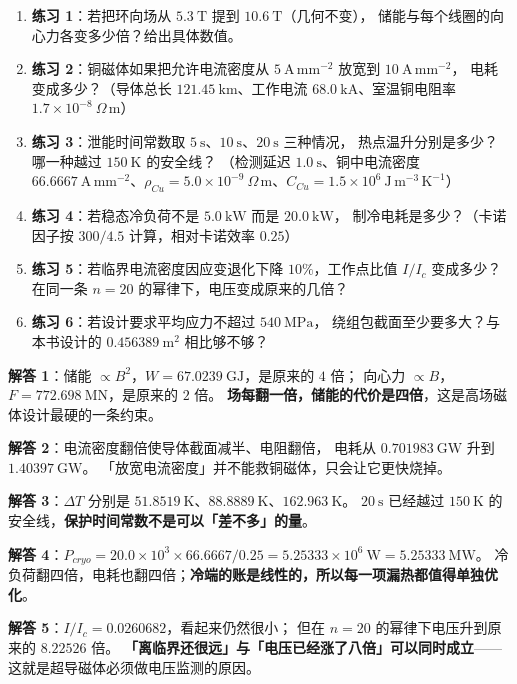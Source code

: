 \begin{enumerate}
\item \textbf{练习 1}：若把环向场从 $5.3\ \mathrm{T}$ 提到 $10.6\ \mathrm{T}$（几何不变），
储能与每个线圈的向心力各变多少倍？给出具体数值。
\item \textbf{练习 2}：铜磁体如果把允许电流密度从 $5\ \mathrm{A\,mm^{-2}}$ 放宽到 $10\ \mathrm{A\,mm^{-2}}$，
电耗变成多少？（导体总长 $121.45\ \mathrm{km}$、工作电流 $68.0\ \mathrm{kA}$、室温铜电阻率 $1.7\times10^{-8}\ \Omega\,\mathrm{m}$）
\item \textbf{练习 3}：泄能时间常数取 $5\ \mathrm{s}$、$10\ \mathrm{s}$、$20\ \mathrm{s}$ 三种情况，
热点温升分别是多少？哪一种越过 $150\ \mathrm{K}$ 的安全线？
（检测延迟 $1.0\ \mathrm{s}$、铜中电流密度 $66.6667\ \mathrm{A\,mm^{-2}}$、$\rho_{Cu}=5.0\times10^{-9}\ \Omega\,\mathrm{m}$、$C_{Cu}=1.5\times10^{6}\ \mathrm{J\,m^{-3}\,K^{-1}}$）
\item \textbf{练习 4}：若稳态冷负荷不是 $5.0\ \mathrm{kW}$ 而是 $20.0\ \mathrm{kW}$，
制冷电耗是多少？（卡诺因子按 $300/4.5$ 计算，相对卡诺效率 $0.25$）
\item \textbf{练习 5}：若临界电流密度因应变退化下降 $10\%$，工作点比值 $I/I_c$ 变成多少？
在同一条 $n=20$ 的幂律下，电压变成原来的几倍？
\item \textbf{练习 6}：若设计要求平均应力不超过 $540\ \mathrm{MPa}$，
绕组包截面至少要多大？与本书设计的 $0.456389\ \mathrm{m^{2}}$ 相比够不够？
\end{enumerate}

\textbf{解答 1}：储能 $\propto B^{2}$，$W=67.0239\ \mathrm{GJ}$，是原来的 $4$ 倍；
向心力 $\propto B$，$F=772.698\ \mathrm{MN}$，是原来的 $2$ 倍。
\textbf{场每翻一倍，储能的代价是四倍}，这是高场磁体设计最硬的一条约束。

\textbf{解答 2}：电流密度翻倍使导体截面减半、电阻翻倍，
电耗从 $0.701983\ \mathrm{GW}$ 升到 $1.40397\ \mathrm{GW}$。
「放宽电流密度」并不能救铜磁体，只会让它更快烧掉。

\textbf{解答 3}：$\Delta T$ 分别是 $51.8519\ \mathrm{K}$、$88.8889\ \mathrm{K}$、$162.963\ \mathrm{K}$。
$20\ \mathrm{s}$ 已经越过 $150\ \mathrm{K}$ 的安全线，\textbf{保护时间常数不是可以「差不多」的量}。

\textbf{解答 4}：$P_{cryo}=20.0\times10^{3}\times66.6667/0.25=5.25333\times10^{6}\ \mathrm{W}=5.25333\ \mathrm{MW}$。
冷负荷翻四倍，电耗也翻四倍；\textbf{冷端的账是线性的，所以每一项漏热都值得单独优化}。

\textbf{解答 5}：$I/I_c=0.0260682$，看起来仍然很小；
但在 $n=20$ 的幂律下电压升到原来的 $8.22526$ 倍。
\textbf{「离临界还很远」与「电压已经涨了八倍」可以同时成立}——
这就是超导磁体必须做电压监测的原因。

